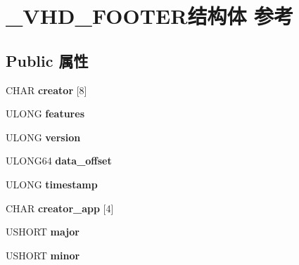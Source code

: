 \hypertarget{struct___v_h_d___f_o_o_t_e_r}{}\section{\+\_\+\+V\+H\+D\+\_\+\+F\+O\+O\+T\+E\+R结构体 参考}
\label{struct___v_h_d___f_o_o_t_e_r}
\subsection*{Public 属性}
\begin{DoxyCompactItemize}
\item 
\mbox{\label{struct___v_h_d___f_o_o_t_e_r_a6b8f5f1aa64c2c878b6aaa32322b563e}} 
C\+H\+AR {\bfseries creator} \mbox{[}8\mbox{]}
\item 
\mbox{\label{struct___v_h_d___f_o_o_t_e_r_a37d23940a0e7e4866a3f4c8fb1950209}} 
U\+L\+O\+NG {\bfseries features}
\item 
\mbox{\label{struct___v_h_d___f_o_o_t_e_r_aed176e09af70bbcf1e551ece925716a7}} 
U\+L\+O\+NG {\bfseries version}
\item 
\mbox{\label{struct___v_h_d___f_o_o_t_e_r_a84b1608d942629333278c9010a702c4c}} 
U\+L\+O\+N\+G64 {\bfseries data\+\_\+offset}
\item 
\mbox{\label{struct___v_h_d___f_o_o_t_e_r_a6780764f9f78d614111751777a5f7ceb}} 
U\+L\+O\+NG {\bfseries timestamp}
\item 
\mbox{\label{struct___v_h_d___f_o_o_t_e_r_a80c3b0dc445a0693ed438da3c265a478}} 
C\+H\+AR {\bfseries creator\+\_\+app} \mbox{[}4\mbox{]}
\item 
\mbox{\label{struct___v_h_d___f_o_o_t_e_r_ae066d5717b7ed9d533fa65416a9aed5e}} 
U\+S\+H\+O\+RT {\bfseries major}
\item 
\mbox{\label{struct___v_h_d___f_o_o_t_e_r_a05b14394a8f1d3eb5da687930d9849a2}} 
U\+S\+H\+O\+RT {\bfseries minor}
\item 

\end{DoxyCompactItemize}
